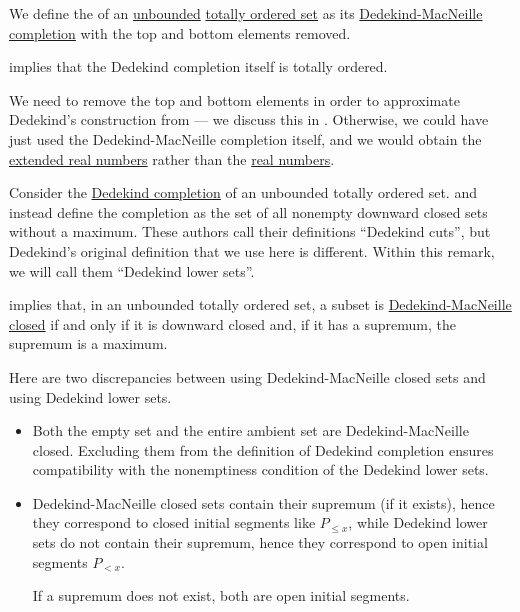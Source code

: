 \begin{definition}\label{def:dedekind_completion}\mimprovised
  We define the  of an \hyperref[def:extremal_points/bounds]{unbounded} \hyperref[def:totally_ordered_set]{totally ordered set} as its \hyperref[def:dedekind_macnielle_completion]{Dedekind-MacNeille completion} with the top and bottom elements removed.
\end{definition}
\begin{comments}
  \item {} implies that the Dedekind completion itself is totally ordered.
  \item We need to remove the top and bottom elements in order to approximate Dedekind's construction from \cite[sec. I.IV]{Beman1901Dedekind} --- we discuss this in . Otherwise, we could have just used the Dedekind-MacNeille completion itself, and we would obtain the \hyperref[def:extended_real_numbers]{extended real numbers} rather than the \hyperref[def:real_numbers]{real numbers}.
\end{comments}

\begin{remark}\label{rem:dedekind_completion_through_dedekind_macneille_closures}
  Consider the \hyperref[def:dedekind_completion]{Dedekind completion} of an unbounded totally ordered set.  and  instead define the completion as the set of all nonempty downward closed sets without a maximum. These authors call their definitions \enquote{Dedekind cuts}, but Dedekind's original definition that we use here is different. Within this remark, we will call them \enquote{Dedekind lower sets}.

   implies that, in an unbounded totally ordered set, a subset is \hyperref[def:dedekind_macnielle_closure]{Dedekind-MacNeille closed} if and only if it is downward closed and, if it has a supremum, the supremum is a maximum.

  Here are two discrepancies between using Dedekind-MacNeille closed sets and using Dedekind lower sets.
  \begin{itemize}
    \item Both the empty set and the entire ambient set are Dedekind-MacNeille closed. Excluding them from the definition of Dedekind completion ensures compatibility with the nonemptiness condition of the Dedekind lower sets.

    \item Dedekind-MacNeille closed sets contain their supremum (if it exists), hence they correspond to closed initial segments like \( P_{\leq x} \), while Dedekind lower sets do not contain their supremum, hence they correspond to open initial segments \( P_{< x} \).

    If a supremum does not exist, both are open initial segments.
  \end{itemize}
\end{remark}

